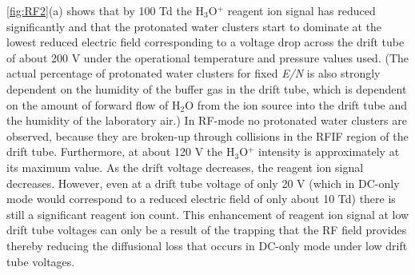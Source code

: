 \autoref{fig:RF2}(a) shows that by 100 Td the H$_3$O$^+$ reagent ion signal has reduced significantly and that the protonated water clusters start to dominate at the lowest reduced electric field corresponding to a voltage drop across the drift tube of about 200 V under the operational temperature and pressure values used. (The actual percentage of protonated water clusters for fixed \textit{E/N} is also strongly dependent on the humidity of the buffer gas in the drift tube, which is dependent on the amount of forward flow of H$_2$O from the ion source into the drift tube and the humidity of the laboratory air.) In RF-mode no protonated water clusters are observed, because they are broken-up through collisions in the RFIF region of the drift tube. Furthermore, at about 120 V the H$_3$O$^+$ intensity is approximately at its maximum value. As the drift voltage decreases, the reagent ion signal decreases. However, even at a drift tube voltage of only 20 V (which in DC-only mode would correspond to a reduced electric field of only about 10 Td) there is still a significant reagent ion count. This enhancement of reagent ion signal at low drift tube voltages can only be a result of the trapping that the RF field provides thereby reducing the diffusional loss that occurs in DC-only mode under low drift tube voltages.















